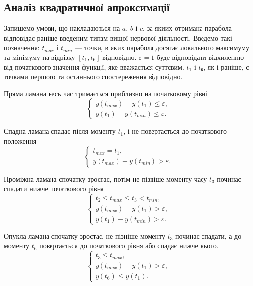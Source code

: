 \subsection{Аналіз квадратичної апроксимації}

Запишемо умови, що накладаються на $a$, $b$ і $c$, за якиих отримана
парабола відповідає раніше введеним типам вищої нервової діяльності.
Введемо такі позначення: $t_{max}$ і $t_{min}$ --- точки, в яких парабола
досягає локального максимуму та мінімуму на відрізку $\left[ t_1, t_6 \right]$
відповідно.
$\varepsilon = 1$ буде відповідати відхиленню від початкового
значення функції, яке вважається суттєвим.
$t_1$ і $t_6$, як і раніше, є точками першого та останнього спостереження
відповідно.

Пряма ламана весь час тримається приблизно на початковому рівні
\begin{equation*}
  \begin{cases}
    y\left( t_{max} \right) - y\left( t_1 \right) \le \varepsilon, \\
    y\left( t_1 \right) - y\left( t_{min} \right) \le \varepsilon.
  \end{cases}
\end{equation*}

Спадна ламана спадає після моменту $t_1$, і не повертається до початкового
положення
\begin{equation*}
  \begin{cases}
    t_{max} = t_1, \\
    y\left( t_{max} \right) - y\left( t_{min} \right) > \varepsilon.
  \end{cases}
\end{equation*}

Проміжна ламана спочатку зростає, потім не пізніше моменту часу $t_3$ починає
спадати нижче початкового рівня
\begin{equation*}
  \begin{cases}
    t_2 \le t_{max} \le t_3 < t_{min}, \\
    y\left( t_{max} \right) - y\left( t_1\right) > \varepsilon, \\
    y\left( t_1 \right) - y\left( t_{min} \right) > \varepsilon.
  \end{cases}
\end{equation*}

Опукла ламана спочатку зростає, не пізніше моменту $t_3$ починає спадати,
а до моменту $t_6$ повертається до початкового рівня або спадає нижче нього.
\begin{equation*}
  \begin{cases}
    t_3 \le t_{max}, \\
    y\left( t_{max} \right) - y\left( t_1\right) > \varepsilon, \\
    y\left( t_6 \right) \le y\left( t_1 \right).
  \end{cases}
\end{equation*}

